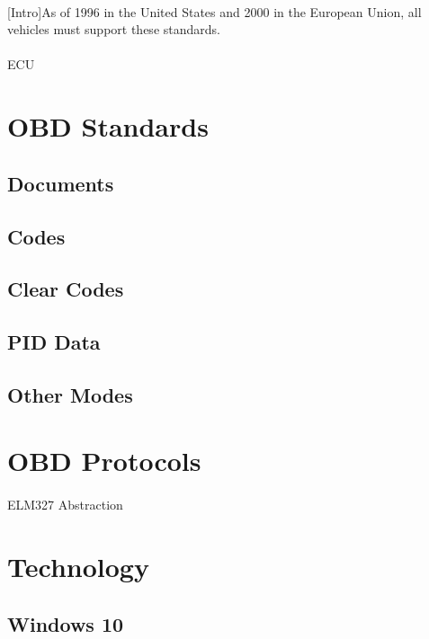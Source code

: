 \documentclass[12pt]{report}
\begin{document}
			\paragraph{}{
			[Intro]As of 1996 in the United States and 2000 in the European Union, all vehicles must support these standards.  
			}
			\paragraph{}{
			ECU
			}
		\section{OBD Standards}
			\subsection{Documents}{
			
			}
			\subsection{Codes}{
			
			}
			\subsection{Clear Codes}{

			}
			\subsection{PID Data}{

			}
			\subsection{Other Modes}{

			}
		\section{OBD Protocols}
			\paragraph{}{
			ELM327 Abstraction
			}
		\section{Technology}
			\subsection{Windows 10}{}{
			
			}
\end{document}
